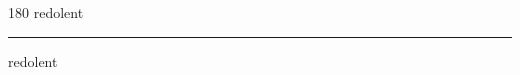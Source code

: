 
\begin{frame}
\begin{center}
\begin{turn}{180}
{\fontsize{2.5cm}{1em}\selectfont redolent}
\end{turn}
\vspace{1em}\par  
\hrule
\vspace{1em}\par  
{\fontsize{2.5cm}{1em}\selectfont redolent}
\end{center}
\end{frame}
